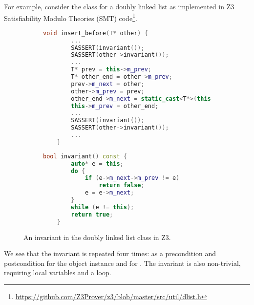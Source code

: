 For example, consider the class for a doubly linked list as implemented in Z3 Satisfiability Modulo Theories (SMT) code\footnote{\url{https://github.com/Z3Prover/z3/blob/master/src/util/dlist.h}}. 
\begin{figure}[htp]
    \centering

\begin{subfigure}[t]{0.55\linewidth}
\begin{lstlisting}[language=c++]
   void insert_before(T* other) {
        ...
        SASSERT(invariant());
        SASSERT(other->invariant());
        ...
        T* prev = this->m_prev;
        T* other_end = other->m_prev;
        prev->m_next = other;
        other->m_prev = prev;
        other_end->m_next = static_cast<T*>(this);
        this->m_prev = other_end;
        ...
        SASSERT(invariant());
        SASSERT(other->invariant());
        ...
    }
\end{lstlisting}
    
\end{subfigure}
\hfill
\begin{subfigure}[t]{0.42\linewidth}
\begin{lstlisting}[language=c++,firstnumber=17]
    bool invariant() const {
        auto* e = this;
        do {
            if (e->m_next->m_prev != e)
                return false;
            e = e->m_next;
        }
        while (e != this);
        return true;
    }
\end{lstlisting}
\end{subfigure}
    \caption{An invariant in the doubly linked list class in Z3.}
    \label{fig:z3_dll}
\end{figure}

We see that the invariant is repeated four times: as a precondition and postcondition for the object instance  and for .
The invariant is also non-trivial, requiring local variables and a loop.

